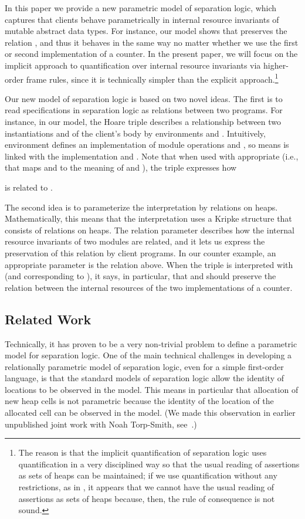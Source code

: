 \documentclass{LMCS}
\begin{document}
In this paper we provide a new parametric model of separation 
logic, which
captures that clients behave parametrically in internal resource
invariants of mutable abstract data types. For instance,
our model shows that  preserves
the relation , and thus it behaves
in the same way no matter whether we use the first or second
implementation of a counter. In the present paper,
we will focus on the implicit approach to quantification over
internal resource invariants via higher-order frame rules, since it is
technically simpler than the explicit approach.\footnote{The reason is that the
implicit quantification of separation logic uses quantification in a very
disciplined way so that the usual reading of assertions as sets of heaps
can be maintained; if we use quantification without any restrictions, 
as in \cite{Benton-CSL06}, it
appears that we cannot have the usual reading of assertions as sets of
heaps because, then, the rule of consequence is not sound.}

Our new model of separation logic is based on two novel ideas.
The first is to read specifications in separation logic
as relations
between two programs. For instance, in our model, the Hoare 
triple  describes 
a relationship between two instantiations
 and  of
the client's body  by environments  and .
Intuitively, environment  defines an implementation
of module operations  and 
, so  means 
 is linked with
the implementation  and .
Note that when used with appropriate 
(i.e.,  that maps  and  to
the meaning of  and ), 
the triple expresses how 
 
is related to .

The second idea is to parameterize the interpretation by
relations on heaps.
Mathematically, this means that the interpretation uses
a Kripke structure that consists of relations on heaps. 
The relation parameter describes
how the internal resource invariants of
two modules are related, and it lets us express the preservation
of this relation by client programs. In our counter example,
an appropriate parameter is the relation  above. When
the triple  is interpreted with
 (and  corresponding to ), 
it says, in particular, that
 and 
should preserve the relation  between the internal resources
of the two implementations of a counter.


\subsection{Related Work}
\label{sec:related-work} 
Technically, it has proven to be a very non-trivial problem to define
a parametric model for separation logic. 
One of the main technical challenges in developing a relationally
parametric model of separation logic, even for a simple first-order
language, is that the standard models of separation logic allow the
identity of locations to be observed in the model.  This means in
particular that allocation of new heap cells is not parametric because the
identity of the location of the allocated cell can be observed in the
model.  (We made this observation in earlier unpublished joint work with
Noah Torp-Smith, see~\cite[Ch.~6]{torp-smith-phd-2005}.)
\end{document}
